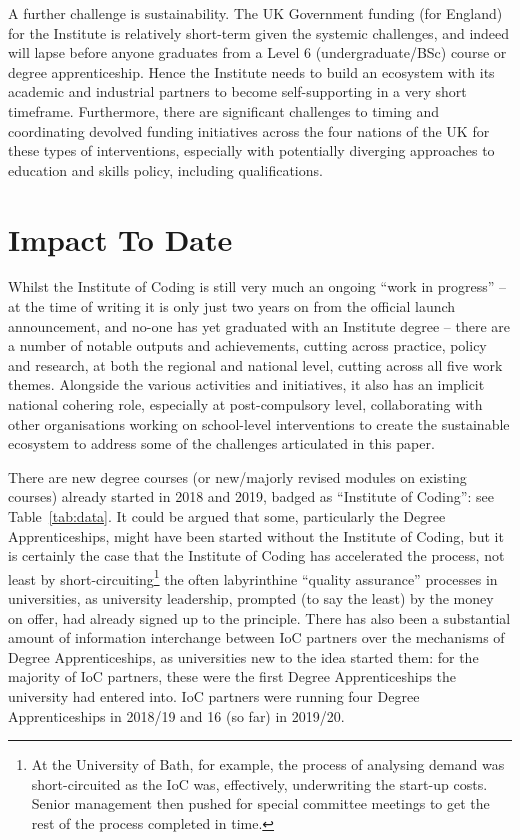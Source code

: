 \documentclass[conference]{IEEEtran}
\begin{document}
A further challenge is sustainability. The UK Government funding (for
England) for the Institute is relatively short-term given the systemic
challenges, and indeed will lapse before anyone graduates from a Level
6 (undergraduate/BSc) course or degree apprenticeship. Hence the
Institute needs to build an ecosystem with its academic and industrial
partners to become self-supporting in a very short
timeframe. Furthermore, there are significant challenges to timing and
coordinating devolved funding initiatives across the four nations of
the UK for these types of interventions, especially with potentially
diverging approaches to education and skills policy, including qualifications.

\section{Impact To Date}\label{impact}

Whilst the Institute of Coding is still very much an ongoing ``work in
progress'' -- at the time of writing it is only just two years on from
the official launch announcement, and no-one has yet graduated with an
Institute degree -- there are a number of notable outputs and
achievements, cutting across practice, policy and research, at both
the regional and national level, cutting across all five work
themes. Alongside the various activities and initiatives, it also has
an implicit national cohering role, especially at post-compulsory
level, collaborating with other organisations working on school-level
interventions to create the sustainable ecosystem to address some of
the challenges articulated in this paper.

There are new degree courses (or new/majorly revised modules on
existing courses) already started in 2018 and 2019, badged as
``Institute of Coding'': see Table~\ref{tab:data}.  It could be argued
that some, particularly the Degree Apprenticeships, might have been
started without the Institute of Coding, but it is certainly the case
that the Institute of Coding has accelerated the process, not least by
short-circuiting\footnote{At the University of Bath, for example, the process of
analysing demand was short-circuited as the IoC was, effectively,
underwriting the start-up costs. Senior management then pushed for
special committee meetings to get the rest of the process completed in
time.} the often labyrinthine ``quality assurance'' processes in
universities, as university leadership, prompted (to say the least) by
the money on offer, had already signed up to the principle. There has
also been a substantial amount of information interchange between IoC
partners over the mechanisms of Degree Apprenticeships, as
universities new to the idea started them: for the majority of IoC
partners, these were the first Degree Apprenticeships the university
had entered into. IoC partners were running four Degree Apprenticeships
in 2018/19 and 16 (so far) in 2019/20.
\end{document}
